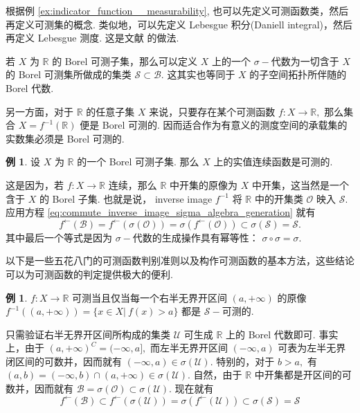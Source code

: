 \documentclass[12pt, a4paper, oneside]{book}
\numberwithin{figure}{section}
\theoremstyle{definition}
\newtheorem{example}[theorem]{例}
\begin{document}
根据例 \ref{ex:indicator_function__measurability}, 也可以先定义可测函数类，然后再定义可测集的概念. 类似地，可以先定义 Lebesgue 积分(Daniell integral)，然后再定义 Lebesgue 测度. 这是文献 \cite{Willem_2022} 的做法.

若 $X$ 为 $\mathbb R$ 的 Borel 可测子集，那么可以定义 $X$ 上的一个 $\sigma-$代数为一切含于 $X$ 的 Borel 可测集所做成的集类 $\mathcal S\subset \mathcal B.$ 这其实也等同于 $X$ 的子空间拓扑所伴随的 Borel 代数.

另一方面，对于 $\mathbb R$ 的任意子集 $X$ 来说，只要存在某个可测函数 $f:X\to\mathbb R,$ 那么集合 $X=f^{-1}(\mathbb R)$ 便是 Borel 可测的. 因而适合作为有意义的测度空间的承载集的实数集必须是 Borel 可测的.
\begin{example}
    设 $X$ 为 $\mathbb R$ 的一个 Borel 可测子集. 那么 $X$ 上的实值连续函数是可测的.
\end{example}
这是因为，若 $f:X\to\mathbb R$ 连续，那么 $\mathbb R$ 中开集的原像为 $X$ 中开集，这当然是一个含于 $X$ 的 Borel 子集.
也就是说， inverse image $f^{-1}$ 将 $\mathbb R$ 中的开集类 $\mathcal O$ 映入 $\mathcal S.$ 应用方程 \eqref{eq:commute_inverse_image_sigma_algebra_generation} 就有
\begin{equation}
    f^\leftarrow(\mathcal B)=f^\leftarrow(\sigma(\mathcal O))=\sigma(f^\leftarrow(\mathcal O))\subset \sigma(\mathcal S)=\mathcal S.
\end{equation}
其中最后一个等式是因为 $\sigma-$代数的生成操作具有幂等性： $\sigma\circ\sigma=\sigma.$

以下是一些五花八门的可测函数判别准则以及构作可测函数的基本方法，这些结论可以为可测函数的判定提供极大的便利.

\begin{example}\label{ex:function__measurability_semiinfinite_open_interval}
    $f:X\to\mathbb R$ 可测当且仅当每一个右半无界开区间 $(a,+\infty)$ 的原像 $f^{-1}((a,+\infty))=\{x\in X|\ f(x)>a\}$ 都是 $\mathcal S-$可测的. 
\end{example}
只需验证右半无界开区间所构成的集类 $\mathcal U$ 可生成 $\mathbb R$ 上的 Borel 代数即可. 事实上，由于 $(a,+\infty)^C=(-\infty,a],$ 而左半无界开区间 $(-\infty,a)$ 可表为左半无界闭区间的可数并，因而就有 $(-\infty,a)\in\sigma(\mathcal U).$ 特别的，对于 $b>a,$ 有 $(a,b)=(-\infty,b)\cap (a,+\infty)\in\sigma(\mathcal U).$ 自然，由于 $\mathbb R$ 中开集都是开区间的可数并，因而就有 
$\mathcal B=\sigma(\mathcal O)\subset\sigma(\mathcal U).$ 现在就有
\begin{equation}
    f^{\leftarrow}(\mathcal B)\subset f^{\leftarrow}(\sigma(\mathcal U))=\sigma(f^{\leftarrow}(\mathcal U))\subset\sigma(\mathcal S)=\mathcal S
\end{equation}
\end{document}
